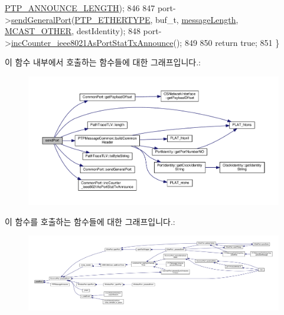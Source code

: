 \begin{DoxyCode}
      \hyperlink{avbts__message_8hpp_ad800b5cd5359d021054af8e902100ba7}{PTP\_ANNOUNCE\_LENGTH});
846 
847     port->\hyperlink{class_common_port_a03f7724f30d3559245970e517b977a82}{sendGeneralPort}(\hyperlink{ptptypes_8hpp_a66b4264d8a3f30b62462917df20c3593}{PTP\_ETHERTYPE}, buf\_t, 
      \hyperlink{class_p_t_p_message_common_a6c490faee54bca860c4d897aae50990f}{messageLength}, \hyperlink{avbts__message_8hpp_aee4ca524cb617678ed1bd2db2b56da42ae55f5cb9fa4a40c0799b62ddf589079f}{MCAST\_OTHER}, destIdentity);
848     port->\hyperlink{class_common_port_ac20ce3b8128ccb0d3015c14fbf126737}{incCounter\_ieee8021AsPortStatTxAnnounce}();
849 
850     \textcolor{keywordflow}{return} \textcolor{keyword}{true};
851 \}
\end{DoxyCode}


이 함수 내부에서 호출하는 함수들에 대한 그래프입니다.\+:
\nopagebreak
\begin{figure}[H]
\begin{center}
\leavevmode
\includegraphics[width=350pt]{class_p_t_p_message_announce_ab6f43fa7d50a13391867209c8a0fca16_cgraph}
\end{center}
\end{figure}




이 함수를 호출하는 함수들에 대한 그래프입니다.\+:
\nopagebreak
\begin{figure}[H]
\begin{center}
\leavevmode
\includegraphics[width=350pt]{class_p_t_p_message_announce_ab6f43fa7d50a13391867209c8a0fca16_icgraph}
\end{center}
\end{figure}


